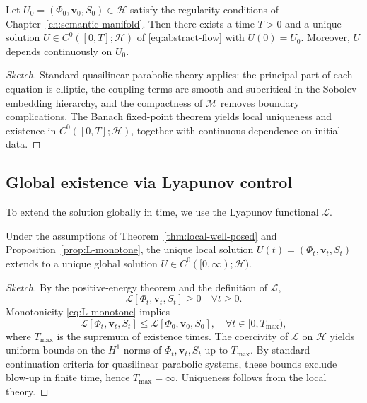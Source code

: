 \begin{theorem}
\label{thm:local-well-posed}
Let $U_0=(\Phi_0,\mathbf{v}_0,S_0)\in \mathcal{H}$ satisfy the regularity
conditions of Chapter~\ref{ch:semantic-manifold}.  
Then there exists a time $T>0$ and a unique solution
$U\in C^0([0,T];\mathcal{H})$ of \eqref{eq:abstract-flow} with $U(0)=U_0$.
Moreover, $U$ depends continuously on $U_0$.
\end{theorem}

\begin{proof}[Sketch]
Standard quasilinear parabolic theory applies: the principal part of each
equation is elliptic, the coupling terms are smooth and subcritical in the
Sobolev embedding hierarchy, and the compactness of $\mathcal{M}$ removes
boundary complications. The Banach fixed-point theorem yields local uniqueness
and existence in $C^0([0,T];\mathcal{H})$, together with continuous
dependence on initial data.
\end{proof}

\subsection{Global existence via Lyapunov control}

To extend the solution globally in time, we use the Lyapunov functional
$\mathscr{L}$.

\begin{theorem}
\label{thm:global-existence}
Under the assumptions of Theorem~\ref{thm:local-well-posed} and
Proposition~\ref{prop:L-monotone}, the unique local solution
$U(t)=(\Phi_t,\mathbf{v}_t,S_t)$ extends to a unique global solution
$U \in C^0([0,\infty);\mathcal{H})$.
\end{theorem}

\begin{proof}[Sketch]
By the positive-energy theorem and the definition of $\mathscr{L}$,
\[
\mathscr{L}[\Phi_t,\mathbf{v}_t,S_t] \ge 0
\quad\forall t\ge 0.
\]
Monotonicity \eqref{eq:L-monotone} implies
\[
\mathscr{L}[\Phi_t,\mathbf{v}_t,S_t]
\le \mathscr{L}[\Phi_0,\mathbf{v}_0,S_0],
\quad \forall t\in[0,T_\mathrm{max}),
\]
where $T_\mathrm{max}$ is the supremum of existence times.
The coercivity of $\mathscr{L}$ on $\mathcal{H}$ yields uniform bounds on the
$H^1$-norms of $\Phi_t,\mathbf{v}_t,S_t$ up to $T_\mathrm{max}$.
By standard continuation criteria for quasilinear parabolic systems, these
bounds exclude blow-up in finite time, hence $T_\mathrm{max}=\infty$.
Uniqueness follows from the local theory.
\end{proof}

